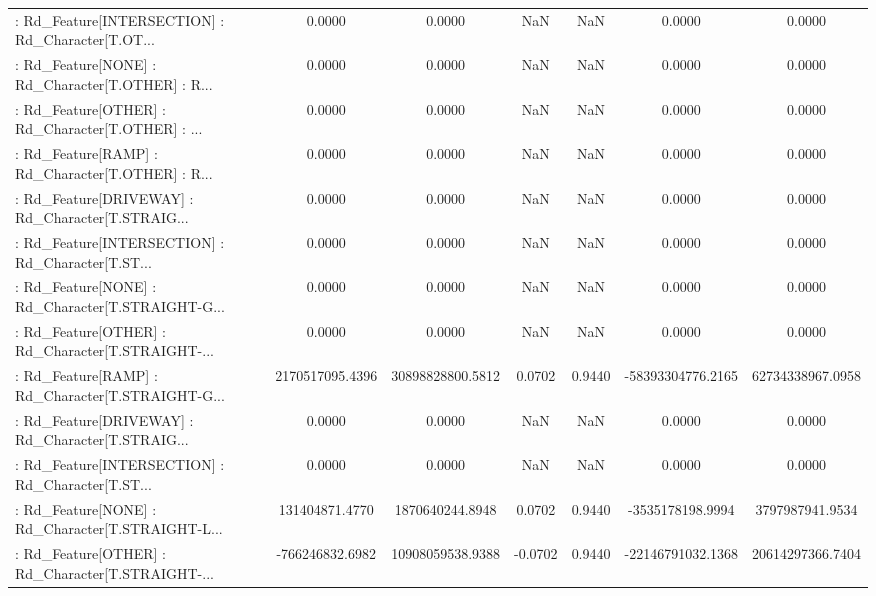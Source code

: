 \begin{longtable}{p{4cm}cccccc}
 : Rd\_Feature[INTERSECTION] : Rd\_Character[T.OT... &            0.0000 &            0.0000 &     NaN &          NaN &             0.0000 &            0.0000 \\
 : Rd\_Feature[NONE] : Rd\_Character[T.OTHER] : R... &            0.0000 &            0.0000 &     NaN &          NaN &             0.0000 &            0.0000 \\
 : Rd\_Feature[OTHER] : Rd\_Character[T.OTHER] : ... &            0.0000 &            0.0000 &     NaN &          NaN &             0.0000 &            0.0000 \\
 : Rd\_Feature[RAMP] : Rd\_Character[T.OTHER] : R... &            0.0000 &            0.0000 &     NaN &          NaN &             0.0000 &            0.0000 \\
 : Rd\_Feature[DRIVEWAY] : Rd\_Character[T.STRAIG... &            0.0000 &            0.0000 &     NaN &          NaN &             0.0000 &            0.0000 \\
 : Rd\_Feature[INTERSECTION] : Rd\_Character[T.ST... &            0.0000 &            0.0000 &     NaN &          NaN &             0.0000 &            0.0000 \\
 : Rd\_Feature[NONE] : Rd\_Character[T.STRAIGHT-G... &            0.0000 &            0.0000 &     NaN &          NaN &             0.0000 &            0.0000 \\
 : Rd\_Feature[OTHER] : Rd\_Character[T.STRAIGHT-... &            0.0000 &            0.0000 &     NaN &          NaN &             0.0000 &            0.0000 \\
 : Rd\_Feature[RAMP] : Rd\_Character[T.STRAIGHT-G... &   2170517095.4396 &  30898828800.5812 &  0.0702 &       0.9440 &  -58393304776.2165 &  62734338967.0958 \\
 : Rd\_Feature[DRIVEWAY] : Rd\_Character[T.STRAIG... &            0.0000 &            0.0000 &     NaN &          NaN &             0.0000 &            0.0000 \\
 : Rd\_Feature[INTERSECTION] : Rd\_Character[T.ST... &            0.0000 &            0.0000 &     NaN &          NaN &             0.0000 &            0.0000 \\
 : Rd\_Feature[NONE] : Rd\_Character[T.STRAIGHT-L... &    131404871.4770 &   1870640244.8948 &  0.0702 &       0.9440 &   -3535178198.9994 &   3797987941.9534 \\
 : Rd\_Feature[OTHER] : Rd\_Character[T.STRAIGHT-... &   -766246832.6982 &  10908059538.9388 & -0.0702 &       0.9440 &  -22146791032.1368 &  20614297366.7404 \\

\end{longtable}
